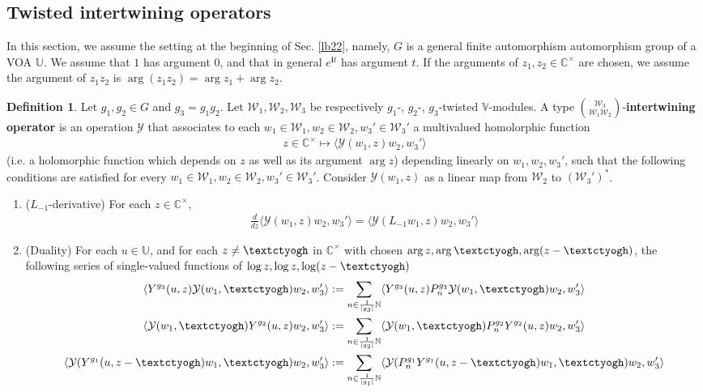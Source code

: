 \documentclass[11pt,b5paper,notitlepage]{article}
\theoremstyle{definition}
\newtheorem{df}{Definition}[subsection]
\theoremstyle{plain}
\newcommand{\mc}{\mathcal}
\newcommand{\bk}[1]{\langle {#1}\rangle}
\newcommand{\im}{\mathbf{i}}
\newcommand{\Vbb}{\mathbb V}
\newcommand{\Ubb}{\mathbb U}
\newcommand{\Cbb}{\mathbb C}
\newcommand{\Nbb}{\mathbb N}
\newcommand{\tipaz}{\text{\textctyogh}}
\numberwithin{equation}{subsection}
\begin{document}
\subsection{Twisted intertwining operators}


In this section, we assume the setting at the beginning of Sec. \ref{lb22}, namely, $G$ is a general finite automorphism automorphism group of a VOA $\Ubb$. We assume that $1$ has argument $0$, and that in general $e^{\im t}$ has argument $t$. If the arguments of $z_1,z_2\in\Cbb^\times$ are chosen, we assume the argument of $z_1z_2$ is $\arg(z_1z_2)=\arg z_1+\arg z_2$.


\begin{df}\label{lb51}
Let $g_1,g_2\in G$ and $g_3=g_1g_2$. Let $\mc W_1,\mc W_2,\mc W_3$ be respectively $g_1$-,  $g_2$-, $g_3$-twisted $\Vbb$-modules. A type $\mc W_3\choose\mc W_1\mc W_2$-\textbf{intertwining operator} is an operation $\mc Y$ that associates to each $w_1\in\mc W_1,w_2\in\mc W_2,w_3'\in\mc W_3'$ a multivalued homolorphic function
\begin{align*}
z\in\Cbb^\times\mapsto \bk{\mc Y(w_1,z)w_2,w_3'}	
\end{align*}
(i.e. a holomorphic function which depends on $z$ as well as its argument $\arg z$) depending linearly on $w_1,w_2,w_3'$, such that the following conditions are satisfied for every $w_1\in\mc W_1,w_2\in\mc W_2,w_3'\in\mc W_3'$. Consider $\mc Y(w_1,z)$ as a linear map from $\mc W_2$ to $(\mc W_3')^*$.
\begin{enumerate}
\item ($L_{-1}$-derivative)	For each $z\in\Cbb^\times$,
\begin{align}
\frac d{dz}\bk{\mc Y(w_1,z)w_2,w_3'}=\bk{\mc Y(L_{-1}w_1,z)w_2,w_3'}	\label{eq81}
\end{align}
\item (Duality)  For each $u\in\Ubb$, and for each $z\neq \tipaz$ in $\Cbb^\times$ with chosen $\arg z,\arg \tipaz,\arg(z-\tipaz)$, the following series of single-valued functions of $\log z,\log z,\log(z-\tipaz)$
\begin{gather}
	\bk{Y^{g_3}(u,z)\mc Y(w_1,\tipaz)w_2,w_3'}:=\sum_{n\in\frac 1{|g_3|}\Nbb}	\bk{Y^{g_3}(u,z)P_n^{g_3}\mc Y(w_1,\tipaz)w_2,w_3'}\label{eq76}\\
	\bk{\mc Y(w_1,\tipaz)Y^{g_2}(u,z)w_2,w_3'}:=\sum_{n\in\frac 1{|g_2|}\Nbb}	\bk{\mc Y(w_1,\tipaz)P_n^{g_2}Y^{g_2}(u,z)w_2,w_3'}\label{eq77}\\
	\bk{\mc Y(Y^{g_1}(u,z-\tipaz)w_1,\tipaz)w_2,w'_3}:=\sum_{n\in\frac 1{|g_1|}\Nbb}	\bk{\mc Y(P_n^{g_1}Y^{g_1}(u,z-\tipaz)w_1,\tipaz)w_2,w'_3}\label{eq78}

\end{gather}
\end{enumerate}
\end{df}
\end{document}
